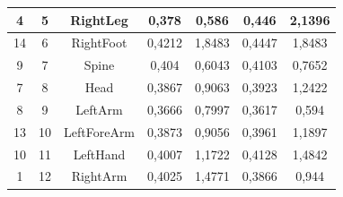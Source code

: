 \begin{table}[h]
\begin{tabular}{|c|c|c|c|c|c|c|}
4        & 5         & RightLeg           & 0,378                                                        & 0,586                                                        & 0,446                                                                   & 2,1396                                                                  \\ \hline
14       & 6         & RightFoot          & 0,4212                                                       & 1,8483                                                       & 0,4447                                                                  & 1,8483                                                                  \\ \hline
9        & 7         & Spine              & 0,404                                                        & 0,6043                                                       & 0,4103                                                                  & 0,7652                                                                  \\ \hline
7        & 8         & Head               & 0,3867                                                       & 0,9063                                                       & 0,3923                                                                  & 1,2422                                                                  \\ \hline
8        & 9         & LeftArm            & 0,3666                                                       & 0,7997                                                       & 0,3617                                                                  & 0,594                                                                   \\ \hline
13       & 10        & LeftForeArm        & 0,3873                                                       & 0,9056                                                       & 0,3961                                                                  & 1,1897                                                                  \\ \hline
10       & 11        & LeftHand           & 0,4007                                                       & 1,1722                                                       & 0,4128                                                                  & 1,4842                                                                  \\ \hline
1        & 12        & RightArm           & 0,4025                                                       & 1,4771                                                       & 0,3866                                                                  & 0,944                                                                   \\ \hline

\end{tabular}
\end{table}
